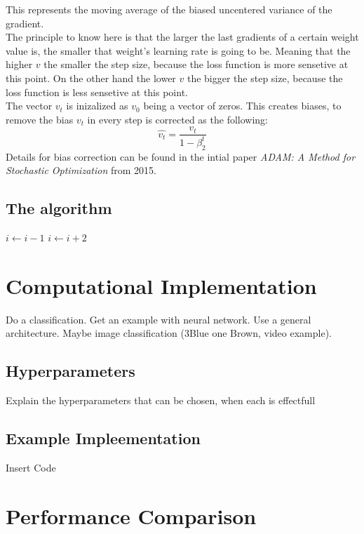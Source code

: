 \documentclass[journal]{IEEEtran}
\begin{document}
This represents the moving average of the biased uncentered variance of the gradient.\\
The principle to know here is that the larger the last gradients of a certain weight value is, the smaller that weight's learning rate is going to be. Meaning that the higher $v$ the smaller the step size, because the loss function is more sensetive at this point. On the other hand the lower $v$ the bigger the step size, because the loss function is less sensetive at this point.\\
The vector $v_t$ is inizalized as $v_0$ being a vector of zeros. This creates biases, to remove the bias $v_t$ in every step is corrected as the following:
$$\hat{v_t}=\frac{v_t}{1-\beta_2^t}$$
Details for bias correction can be found in the intial paper \textit{ADAM: A Method for Stochastic Optimization} from 2015.

\subsection{The algorithm}
\begin{algorithmic}
        \State $i \gets i-1$
    \Else
            \State $i \gets i+2$
        \EndIf
    \EndIf 
\end{algorithmic}







\section{Computational Implementation}
Do a classification.  
Get an example with neural network. Use a general architecture. Maybe image classification (3Blue one Brown, video example).
\subsection{Hyperparameters}
Explain the hyperparameters that can be chosen, when each is effectfull
\subsection{Example Impleementation}
Insert Code

\section{Performance Comparison}
\end{document}
